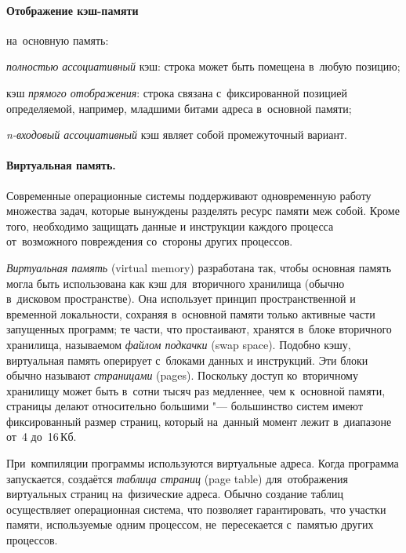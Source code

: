 \paragraph{Отображение кэш-памяти}
на~основную память:
\begin{itemfeature}
  \item \textit{полностью ассоциативный} кэш: строка может быть помещена в~любую позицию;
  \item кэш \textit{прямого отображения}: строка связана с~фиксированной позицией определяемой, например, младшими битами адреса в~основной памяти;
  \item \textit{n-входовый ассоциативный} кэш являет собой промежуточный вариант.
\end{itemfeature}



\paragraph{Виртуальная память.}
Современные операционные системы поддерживают одновременную работу множества задач, которые вынуждены разделять ресурс памяти меж собой. Кроме того, необходимо защищать данные и инструкции каждого процесса от~возможного повреждения со~стороны других процессов.

\emph{Виртуальная память} (\textenglish{virtual memory}) разработана так, чтобы основная память могла быть использована как кэш для~вторичного хранилища (обычно в~дисковом пространстве). Она использует принцип пространственной и временной локальности, сохраняя в~основной памяти только активные части запущенных программ; те части, что простаивают, хранятся в~блоке вторичного хранилища, называемом \textit{файлом подкачки} (\textenglish{swap space}). Подобно кэшу, виртуальная память оперирует с~блоками данных и инструкций. Эти блоки обычно называют \emph{страницами} (\textenglish{pages}). Поскольку доступ ко~вторичному хранилищу может быть в~сотни тысяч раз медленнее, чем к~основной памяти, страницы делают относительно большими "--- большинство систем имеют фиксированный размер страниц, который на~данный момент лежит в~диапазоне от~4 до~16\,Кб.

При~компиляции программы используются виртуальные адреса. Когда программа запускается, создаётся \emph{таблица страниц} (\textenglish{page table}) для~отображения виртуальных страниц на~физические адреса. Обычно создание таблиц осуществляет операционная система, что позволяет гарантировать, что участки памяти, используемые одним процессом, не~пересекается с~памятью других процессов.

